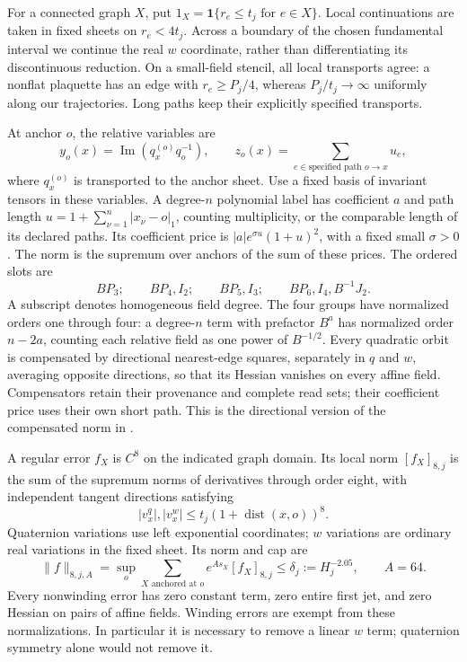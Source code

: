 For a connected graph $X$, put
$1_X=\mathbf1\{r_e\le t_j\text{ for }e\in X\}$.  Local continuations are
taken in fixed sheets on $r_e<4t_j$.  Across a boundary of the chosen
fundamental interval we continue the real $w$ coordinate, rather than
differentiating its discontinuous reduction.  On a small-field stencil,
all local transports agree: a nonflat plaquette has an edge with
$r_e\ge P_j/4$, whereas $P_j/t_j\to\infty$ uniformly along our
trajectories.  Long paths keep their explicitly specified transports.

At anchor $o$, the relative variables are
\[
 y_o(x)=\operatorname{Im}(q_x^{(o)}q_o^{-1}),\qquad
 z_o(x)=\sum_{e\in\text{specified path }o\to x}u_e,
\]
where $q_x^{(o)}$ is transported to the anchor sheet.  Use a fixed basis
of invariant tensors in these variables.  A degree-$n$ polynomial label
has coefficient $a$ and path length
$u=1+\sum_{\nu=1}^n|x_\nu-o|_1$, counting multiplicity, or the comparable
length of its declared paths.  Its coefficient price is
$|a|e^{\sigma u}(1+u)^2$, with a fixed small $\sigma>0$.  The norm is the
supremum over anchors of the sum of these prices.  The ordered slots are
\begin{equation}
 BP_3;\qquad BP_4,I_2;\qquad BP_5,I_3;\qquad
                      BP_6,I_4,B^{-1}J_2.
 \label{eq:R5}
\end{equation}
A subscript denotes homogeneous field degree.  The four groups have
normalized orders one through four: a degree-$n$ term with prefactor
$B^a$ has normalized order $n-2a$, counting each relative field as one
power of $B^{-1/2}$.  Every quadratic orbit
is compensated by directional nearest-edge squares, separately in $q$
and $w$, averaging opposite directions, so that its Hessian vanishes on
every affine field.  Compensators retain their provenance and complete
read sets; their coefficient price uses their own short path.  This is
the directional version of the compensated norm in
\cite[Appendix ``A fixed coefficient norm for the diagonal canonical
map'']{SharpO4}.

A regular error $f_X$ is $C^8$ on the indicated graph domain.  Its local
norm $[f_X]_{8,j}$ is the sum of the supremum norms of derivatives through
order eight, with independent tangent directions satisfying
\[
 |v_x^q|,|v_x^w|\le t_j(1+\operatorname{dist}(x,o))^8.
\]
Quaternion variations use left exponential coordinates; $w$ variations
are ordinary real variations in the fixed sheet.  Its norm and cap are
\[
 \|f\|_{8,j,A}=\sup_o\sum_{X\text{ anchored at }o}
          e^{As_X}[f_X]_{8,j}\le\delta_j:=H_j^{-2.05},\qquad A=64.
\]
Every nonwinding error has zero constant term, zero entire first jet,
and zero Hessian on pairs of affine fields.  Winding errors are exempt
from these normalizations.  In particular it is necessary to remove a
linear $w$ term; quaternion symmetry alone would not remove it.

